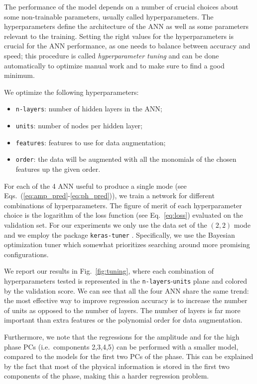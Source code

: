 \documentclass[twocolumn,showpacs,preprintnumbers,nofootinbib,prd,
superscriptaddress,10pt]{revtex4-2}
\begin{document}
The performance of the model depends on a number of crucial choices about some non-trainable parameters, usually called 
hyperparameters. The hyperparameters define the architecture of the ANN as well as some parameters relevant to the training.
Setting the right values for the hyperparameters is crucial for the ANN performance, as one needs to balance 
between accuracy and speed; this procedure is called {\it hyperparameter tuning} and can be done automatically to 
optimize manual work and to make sure to find a good minimum.

We optimize the following hyperparameters:
\begin{itemize}
	\item \texttt{n-layers}: number of hidden layers in the ANN;
	\item \texttt{units}: number of nodes per hidden layer;
	\item \texttt{features}: features to use for data augmentation;
	\item \texttt{order}: the data will be augmented with all the monomials of the chosen features up the given order.
\end{itemize}

For each of the 4 ANN useful to produce a single mode (see Eqs.~(\ref{eq:amp_pred}-\ref{eq:ph_pred})), we train a network for different combinations of hyperparameters. The figure of merit of each 
hyperparameter choice is the logarithm of the loss function (see Eq.~\eqref{eq:loss}) evaluated on the validation set.
For our experiments we only use the data set of the $(2,2)$ mode and we employ the package \texttt{keras-tuner} \cite{omalley2019kerastuner}. Specifically, we use the Bayesian optimization tuner which somewhat prioritizes searching around more promising configurations.

We report our results in Fig.~\ref{fig:tuning}, where each combination of hyperparameters tested is represented in the \texttt{n-layers}-\texttt{units} plane and colored by the validation score. 
We can see that all the four ANN share the same trend: the most effective way to improve regression accuracy is to increase the number of units as opposed to the number of layers.
The number of layers is far more important than extra features or the polynomial order for data augmentation.

Furthermore, we note that the regressions for the amplitude and for the high phase PCs 
(i.e.~components 2,3,4,5) can be performed with a smaller model, compared to the models for the first two PCs of the phase. 
This can be explained by the fact that most of the physical information is stored in the first two components of the phase, making this a harder regression problem.
\end{document}
